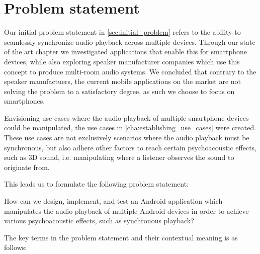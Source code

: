 \chapter{Problem statement}
Our initial problem statement in \cref{sec:initial_problem} refers to the ability to seamlessly synchronize audio playback across multiple devices.
Through our state of the art chapter we investigated applications that enable this for smartphone devices, while also exploring speaker manufacturer companies which use this concept to produce multi-room audio systems. 
We concluded that contrary to the speaker manufactuers, the current mobile applications on the market are not solving the problem to a satisfactory degree, as such we choose to focus on smartphones.

Envisioning use cases where the audio playback of multiple smartphone devices could be manipulated, the use cases in \cref{cha:establishing_use_cases} were created.
These use cases are not exclusively scenarios where the audio playback must be synchronous, but also adhere other factors to reach certain psychoacoustic effects, such as 3D sound, i.e. manipulating where a listener observes the sound to originate from.

This leads us to formulate the following problem statement:

\begin{problemstatement}
    How can we design, implement, and test an Android application which manipulates the audio playback of multiple Android devices in order to achieve various psychoacoustic effects, such as synchronous playback?
\end{problemstatement}

The key terms in the problem statement and their contextual meaning is as follows:

